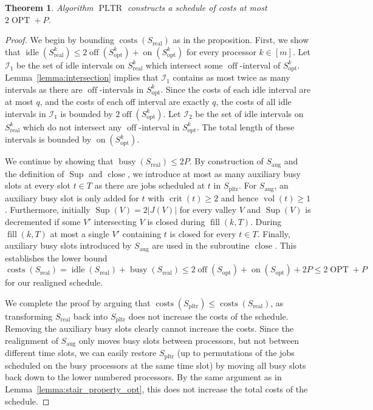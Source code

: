 \documentclass[a4paper]{article}
\DeclareMathOperator{\on}{on}
\DeclareMathOperator{\off}{off}
\DeclareMathOperator{\idle}{idle}
\DeclareMathOperator{\busy}{busy}
\DeclareMathOperator{\costs}{costs}
\DeclareMathOperator{\OPT}{OPT}
\DeclareMathOperator{\opt}{opt}
\DeclareMathOperator{\pltr}{pltr}
\DeclareMathOperator{\PLTR}{PLTR}
\DeclareMathOperator{\aug}{aug}
\DeclareMathOperator{\real}{real}
\DeclareMathOperator{\vol}{vol}
\DeclareMathOperator{\crit}{crit}
\DeclareMathOperator{\fillop}{fill}
\DeclareMathOperator{\close}{close}
\DeclareMathOperator{\res}{Sup}
\newtheorem{theorem}{Theorem}
\newtheorem{lemma}[theorem]{Lemma}
\begin{document}
\begin{theorem}\label{theorem:approximation}
  Algorithm $\PLTR$ constructs a schedule of costs at most $2 \OPT + P$.
\end{theorem}
\begin{proof}
  We begin by bounding $\costs(S_{\real})$ as in the proposition.
  First, we show that $\idle(S^k_{\real}) \leq 2 \off(S^k_{\opt}) + \on(S^k_{\opt})$ for every processor $k \in [m]$.
  Let $\mathcal{I}_1$ be the set of idle intervals on $S^k_{\real}$ which intersect some $\off$-interval of $S^k_{\opt}$.
  Lemma~\ref{lemma:intersection} implies that $\mathcal{I}_1$ contains as most twice as many intervals as there are $\off$-intervals in $S^k_{\opt}$.
  Since the costs of each idle interval are at most $q$, and the costs of each off interval are exactly $q$, the costs of all idle intervals in $\mathcal{I}_1$ is bounded by $2 \off(S^k_{\opt})$.
  Let $\mathcal{I}_2$ be the set of idle intervals on $S^k_{\real}$ which do not intersect any $\off$-interval in $S^k_{\opt}$.
  The total length of these intervals is bounded by $\on(S^k_{\opt})$.

  We continue by showing that $\busy(S_{\real}) \leq 2 P$.
  By construction of $S_{\aug}$ and the definition of $\res$ and $\close$, we introduce at most as many auxiliary busy slots at every slot $t \in T$ as there are jobs scheduled at $t$ in $S_{\pltr}$.
  For $S_{\aug}$, an auxiliary busy slot is only added for $t$ with $\crit(t) \geq 2$ and hence $\vol(t) \geq 1$.
  Furthermore, initially $\res(V) = 2 |J(V)|$ for every valley $V$ and $\res(V)$ is decremented if some $V'$ intersecting $V$ is closed during $\fillop(k, T)$.
  During $\fillop(k, T)$ at most a single $V'$ containing $t$ is closed for every $t \in T$.
  Finally, auxiliary busy slots introduced by $S_{\aug}$ are used in the subroutine $\close$.
  This establishes the lower bound $\costs(S_{\real}) = \idle(S_{\real}) + \busy(S_{\real}) \leq 2 \off(S_{\opt}) + \on(S_{\opt}) + 2 P \leq 2 \OPT + P$ for our realigned schedule.

  We complete the proof by arguing that $\costs(S_{\pltr}) \leq \costs(S_{\real})$, as transforming $S_{\real}$ back into $S_{\pltr}$ does not increase the costs of the schedule.
  Removing the auxiliary busy slots clearly cannot increase the costs.
  Since the realignment of $S_{\aug}$ only moves busy slots between processors, but not between different time slots, we can easily restore $S_{\pltr}$ (up to permutations of the jobs scheduled on the busy processors at the same time slot) by moving all busy slots back down to the lower numbered processors.
  By the same argument as in Lemma~\ref{lemma:stair_property_opt}, this does not increase the total costs of the schedule.
\end{proof}
\end{document}
